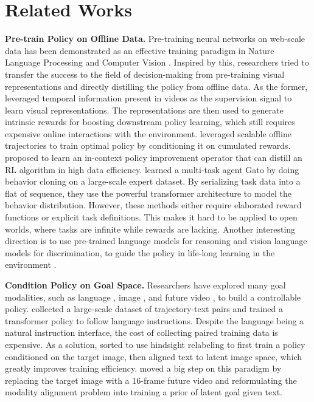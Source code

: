 \documentclass[11pt, a4paper, logo, one column]{craftjarvis}
\begin{document}
\section{Related Works}
\vspace{-0.20em}
\textbf{Pre-train Policy on Offline Data.} Pre-training neural networks on web-scale data has been demonstrated as an effective training paradigm in Nature Language Processing \citep{gpt3} and Computer Vision \citep{sam}. Inspired by this, researchers tried to transfer the success to the field of decision-making from pre-training visual representations and directly distilling the policy from offline data. As the former, \cite{2018play, ap} leveraged temporal information present in videos as the supervision signal to learn visual representations. The representations are then used to generate intrinsic rewards for boosting downstream policy learning, which still requires expensive online interactions with the environment. \cite{udrl, dt} leveraged scalable offline trajectories to train optimal policy by conditioning it on cumulated rewards. 
\cite{algo-distil} proposed to learn an in-context policy improvement operator that can distill an RL algorithm in high data efficiency. \cite{gato} learned a multi-task agent Gato by doing behavior cloning on a large-scale expert dataset. By serializing task data into a flat of sequence, they use the powerful transformer architecture to model the behavior distribution. 
However, these methods either require elaborated reward functions or explicit task definitions. This makes it hard to be applied to open worlds, where tasks are infinite while rewards are lacking. 
Another interesting direction is to use pre-trained language models for reasoning and vision language models for discrimination, to guide the policy in life-long learning in the environment \citep{uni}. 


\textbf{Condition Policy on Goal Space.}
Researchers have explored many goal modalities, such as language \citep{vln-clip}, image \citep{ogn1}, and future video \citep{traj}, to build a controllable policy. 
\cite{rt-1} collected a large-scale dataset of trajectory-text pairs and trained a transformer policy to follow language instructions. Despite the language being a natural instruction interface, the cost of collecting paired training data is expensive. As a solution, \cite{zson} sorted to use hindsight relabeling to first train a policy conditioned on the target image, then aligned text to latent image space, which greatly improves training efficiency. \cite{steve1} moved a big step on this paradigm by replacing the target image with a 16-frame future video and reformulating the modality alignment problem into training a prior of latent goal given text. 
\end{document}
